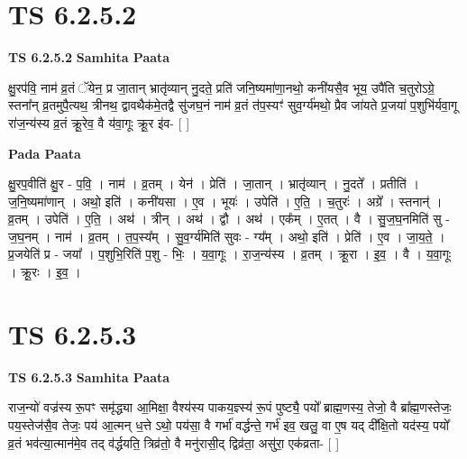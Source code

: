 \documentclass[17pt]{extarticle}
\begin{document}

\section{ TS 6.2.5.2 }

\textbf{TS 6.2.5.2 } \newline
\textbf{Samhita Paata} \newline

क्षु॒रप॑वि॒ नाम॑ व्र॒तं ॅयेन॒ प्र जा॒तान् भ्रातृ॑व्यान् नु॒दते॒ प्रति॑ जनि॒ष्यमा॑णा॒नथो॒ कनी॑यसै॒व भूय॒ उपै॑ति च॒तुरोऽग्रे॒ स्तना᳚न् व्र॒तमुपै॒त्यथ॒ त्रीनथ॒ द्वावथैक॑मे॒तद्वै सु॑जघ॒नं नाम॑ व्र॒तं त॑प॒स्यꣳ॑ सुव॒र्ग्य॑मथो॒ प्रैव जा॑यते प्र॒जया॑ प॒शुभि॑र्यवा॒गू रा॑ज॒न्य॑स्य व्र॒तं क्रू॒रेव॒ वै य॑वा॒गूः क्रू॒र इ॑व- [  ] \newline

\textbf{Pada Paata} \newline

क्षु॒रप॒वीति॑ क्षु॒र - प॒वि॒ । नाम॑ । व्र॒तम् । येन॑ । प्रेति॑ । जा॒तान् । भ्रातृ॑व्यान् । नु॒दते᳚ । प्रतीति॑ । ज॒नि॒ष्यमा॑णान् । अथो॒ इति॑ । कनी॑यसा । ए॒व । भूयः॑ । उपेति॑ । ए॒ति॒ । च॒तुरः॑ । अग्रे᳚ । स्तनान्॑ । व्र॒तम् । उपेति॑ । ए॒ति॒ । अथ॑ । त्रीन् । अथ॑ । द्वौ । अथ॑ । एक᳚म् । ए॒तत् । वै । सु॒ज॒घ॒नमिति॑ सु - ज॒घ॒नम् । नाम॑ । व्र॒तम् । त॒प॒स्य᳚म् । सु॒व॒र्ग्य॑मिति॑ सुवः - ग्य᳚म् । अथो॒ इति॑ । प्रेति॑ । ए॒व । जा॒य॒ते॒ । प्र॒जयेति॑ प्र - जया᳚ । प॒शुभि॒रिति॑ प॒शु - भिः॒ । य॒वा॒गूः । रा॒ज॒न्य॑स्य । व्र॒तम् । क्रू॒रा । इ॒व॒ । वै । य॒वा॒गूः । क्रू॒रः । इ॒व॒ ।  \newline





\section{ TS 6.2.5.3 }

\textbf{TS 6.2.5.3 } \newline
\textbf{Samhita Paata} \newline

राज॒न्यो॑ वज्र॑स्य रू॒पꣳ समृ॑द्ध्या आ॒मिक्षा॒ वैश्य॑स्य पाकय॒ज्ञ्स्य॑ रू॒पं पुष्ट्यै॒ पयो᳚ ब्राह्म॒णस्य॒ तेजो॒ वै ब्रा᳚ह्म॒णस्तेजः॒ पय॒स्तेज॑सै॒व तेजः॒ पय॑ आ॒त्मन् ध॒त्ते ऽथो॒ पय॑सा॒ वै गर्भा॑ वर्द्धन्ते॒ गर्भ॑ इव॒ खलु॒ वा ए॒ष यद् दी᳚क्षि॒तो यद॑स्य॒ पयो᳚ व्र॒तं भव॑त्या॒त्मान॑मे॒व तद् व॑र्द्धयति॒ त्रिव्र॑तो॒ वै मनु॑रासी॒द् द्विव्र॑ता॒ असु॑रा॒ एक॑व्रता- [  ] \newline
\end{document}
